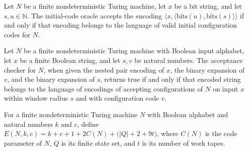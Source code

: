\begin{lemma}
\label{Complexity.LogProg.SavitchARM.initO_orcN}
\leanok
{}
Let $N$ be a finite nondeterministic Turing machine, let $x$ be a bit string, and let
$s,u\in\mathbb{N}$. The initial-code oracle accepts the encoding $\langle x,\langle
\mathrm{bits}(u),\mathrm{bits}(s)\rangle\rangle$ if and only if that encoding belongs to
the language of valid initial configuration codes for $N$.
\end{lemma}

\begin{lemma}
\label{Complexity.LogProg.SavitchARM.accO_orcN}
\leanok
{}
Let $N$ be a finite nondeterministic Turing machine with Boolean input alphabet, let $x$
be a finite Boolean string, and let $s,v$ be natural numbers. The acceptance checker for
$N$, when given the nested pair encoding of $x$, the binary expansion of $v$, and the
binary expansion of $s$, returns true if and only if that encoded string belongs to the
language of encodings of accepting configurations of $N$ on input $x$ within window
radius $s$ and with configuration code $v$.
\end{lemma}

\begin{definition}
\label{Complexity.LogProg.SavitchARM.bigE}
\leanok
{}
For a finite nondeterministic Turing machine $N$ with Boolean alphabet and natural
numbers $k$ and $c$, define $E(N,k,c)=k+c+1+2C(N)+\bigl(|Q|+2+9t\bigr)$, where $C(N)$ is
the code parameter of $N$, $Q$ is its finite state set, and $t$ is its number of work
tapes.
\end{definition}

